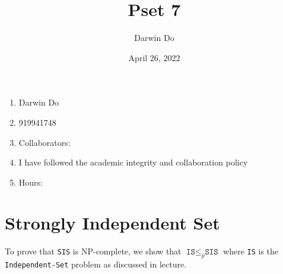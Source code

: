 \documentclass{article}
\title{Pset 7}
\begin{document}
\newcommand{\Not}{\textbf{not}}
\newcommand{\AAnd}{\textbf{and}}
\newcommand{\Or}{\textbf{or}}
\newcommand{\True}{\texttt{True}}
\newcommand{\False}{\texttt{False}}

\date{April 26, 2022 }
\author{Darwin Do}

\maketitle

\begin{enumerate}
    \item Darwin Do
    \item 919941748
    \item Collaborators: 
    \item I have followed the academic integrity and collaboration policy
    \item Hours: 
\end{enumerate}

\newpage

\section{Strongly Independent Set}

To prove that \texttt{SIS} is NP-complete, we show that $\texttt{IS} \leq_p \texttt{SIS}$ where \texttt{IS} is the \texttt{Independent-Set} problem as discussed in lecture.
\end{document}

